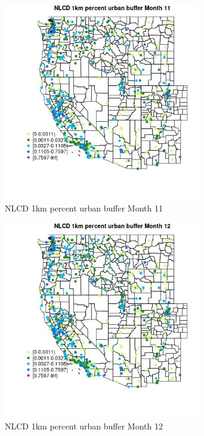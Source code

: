 \begin{figure} 
\centering  
\includegraphics[width=0.77\textwidth]{Code_Outputs/Report_ML_input_PM25_Step4_part_e_de_duplicated_aves_compiled_2019-05-14wNAs_MapObsMo11NLCD_1km_percent_urban_buffer.jpg} 
\caption{\label{fig:Report_ML_input_PM25_Step4_part_e_de_duplicated_aves_compiled_2019-05-14wNAsMapObsMo11NLCD_1km_percent_urban_buffer}NLCD 1km percent urban buffer Month 11} 
\end{figure} 
 

\clearpage 

\begin{figure} 
\centering  
\includegraphics[width=0.77\textwidth]{Code_Outputs/Report_ML_input_PM25_Step4_part_e_de_duplicated_aves_compiled_2019-05-14wNAs_MapObsMo12NLCD_1km_percent_urban_buffer.jpg} 
\caption{\label{fig:Report_ML_input_PM25_Step4_part_e_de_duplicated_aves_compiled_2019-05-14wNAsMapObsMo12NLCD_1km_percent_urban_buffer}NLCD 1km percent urban buffer Month 12} 
\end{figure} 
 


